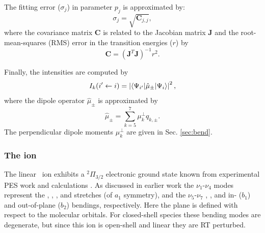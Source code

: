The fitting error ($\sigma_j$) in parameter $p_j$ is approximated by: 
\begin{equation}
\label{eq:sigma_par}
    \sigma_j = \sqrt{{\bm C}_{j,j}},
\end{equation}
where the covariance matrix ${\bm C}$ is related to the Jacobian matrix ${\bm J}$ and the root-mean-squares (RMS) error in the transition energies ($r$) by
\begin{equation}
\label{eq:cov}
    {\bm C} = ({\bm J}^T {\bm J})^{-1} r^2.
\end{equation}

Finally, the intensities are computed by
\begin{equation}
    I_k(i'\leftarrow i) = \left|\langle \Psi_{i'} |\hat{\mu}_{\pm}| \Psi_{i} \rangle\right|^2,
\end{equation}
where the dipole operator $\hat{\mu}_{\pm}$ is approximated by
\begin{equation}
    \hat{\mu}_{\pm} = \sum_{k=5}^7\mu_k^\perp q_{k,\pm}.
\end{equation}
The perpendicular dipole moments $\mu^{\perp}_k$ are given in Sec. \ref{sec:bend}.  

\subsubsection{The \texorpdfstring{\ion}{HC3N+} ion}

The linear \ion\ ion exhibits a $^2\Pi_{3/2}$ electronic ground state known from experimental PES work and calculations \cite{Desrier2016ExperimentalSpectroscopy,Gans2016ExperimentalSpectroscopy, Dai2015TheCalculations}. As discussed in earlier work \cite{Leach2014IonizationCyanoacetylene,Dai2015TheCalculations,Desrier2016ExperimentalSpectroscopy,Gans2016ExperimentalSpectroscopy} the $\nu_1$-$\nu_4$ modes represent the , , , and  stretches (of $a_1$ symmetry), and the $\nu_5$-$\nu_7$ , , and  in- ($b_1$) and out-of-plane ($b_2$) bendings, respectively. Here the plane is defined with respect to the molecular orbitals.  For closed-shell species these bending modes are degenerate, but since this ion is open-shell and linear they are RT perturbed.

